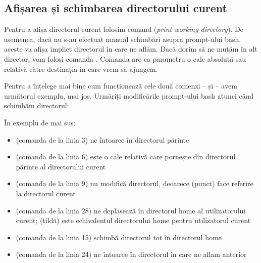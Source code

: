 \subsection{Afișarea și schimbarea directorului curent}
\label{sec:file-system-file-list-cd}

Pentru a afișa directorul curent folosim comand  (\textit{print working
directory}). De asemenea, dacă nu s-au efectuat manual schimbări asupra
prompt-ului bash, aceste va afișa implict directorul în care ne aflăm. Dacă
dorim să ne mutăm în alt director, vom folosi comanda . Comanda
 are ca parametru o cale absolută sau relativă către destinația în care
vrem să ajungem.

Pentru a înțelege mai bine cum funcționează cele două comenzi --  și
 -- avem următorul exemplu, mai jos. Urmăriți modificările prompt-ului
bash atunci când schimbăm directorul:



În exemplu de mai sus:
\begin{itemize}
	\item {} (comanda de la linia 3) ne întoarce în directorul
		părinte
	\item {} (comanda de la linia 6) este o cale
		relativă care pornește din directorul părinte al directorului
		curent
	\item {} (comanda de la linia 9) nu modifică directorul,
          deoarece  (punct) face referire la directorul curent
	\item {} (comanda de la linia 28) ne deplasează
          în directorul home al utilizatorului curent; \file{\textasciitilde} (tildă)
		este echivalentul directorului home pentru utilizatorul curent
	\item {} (comanda de la linia 15) schimbă directorul tot în
		directorul home
	\item {} (comanda de la linia 24) ne întoarce în directorul
		în care ne aflam anterior
\end{itemize}


